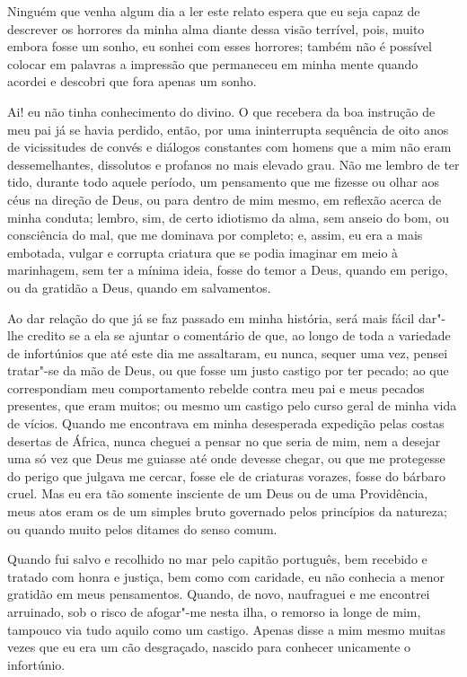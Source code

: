 Ninguém que venha algum dia a ler este relato espera que eu seja capaz
de descrever os horrores da minha alma diante dessa visão terrível,
pois, muito embora fosse um sonho, eu sonhei com esses horrores; também
não é possível colocar em palavras a impressão que permaneceu em minha
mente quando acordei e descobri que fora apenas um sonho.

Ai! eu não tinha conhecimento do divino. O que recebera da boa instrução
de meu pai já se havia perdido, então, por uma ininterrupta sequência de
oito anos de vicissitudes de convés e diálogos constantes com homens que
a mim não eram dessemelhantes, dissolutos e profanos no mais elevado
grau. Não me lembro de ter tido, durante todo aquele período, um
pensamento que me fizesse ou olhar aos céus na direção de Deus, ou para
dentro de mim mesmo, em reflexão acerca de minha conduta; lembro, sim,
de certo idiotismo da alma, sem anseio do bom, ou consciência do mal,
que me dominava por completo; e, assim, eu era a mais embotada, vulgar e
corrupta criatura que se podia imaginar em meio à marinhagem, sem ter a
mínima ideia, fosse do temor a Deus, quando em perigo, ou da gratidão a
Deus, quando em salvamentos.

Ao dar relação do que já se faz passado em minha história, será mais
fácil dar"-lhe credito se a ela se ajuntar o comentário de que, ao longo
de toda a variedade de infortúnios que até este dia me assaltaram, eu
nunca, sequer uma vez, pensei tratar"-se da mão de Deus, ou que fosse um
justo castigo por ter pecado; ao que correspondiam meu comportamento
rebelde contra meu pai e meus pecados presentes, que eram muitos; ou
mesmo um castigo pelo curso geral de minha vida de vícios. Quando me
encontrava em minha desesperada expedição pelas costas desertas de
África, nunca cheguei a pensar no que seria de mim, nem a desejar uma só
vez que Deus me guiasse até onde devesse chegar, ou que me protegesse do
perigo que julgava me cercar, fosse ele de criaturas vorazes, fosse do
bárbaro cruel. Mas eu era tão somente insciente de um Deus ou de uma
Providência, meus atos eram os de um simples bruto governado pelos
princípios da natureza; ou quando muito pelos ditames do senso comum.

Quando fui salvo e recolhido no mar pelo capitão português, bem recebido
e tratado com honra e justiça, bem como com caridade, eu não conhecia a
menor gratidão em meus pensamentos. Quando, de novo, naufraguei e me
encontrei arruinado, sob o risco de afogar"-me nesta ilha, o remorso ia
longe de mim, tampouco via tudo aquilo como um castigo. Apenas disse a
mim mesmo muitas vezes que eu era um cão desgraçado, nascido para
conhecer unicamente o infortúnio.

